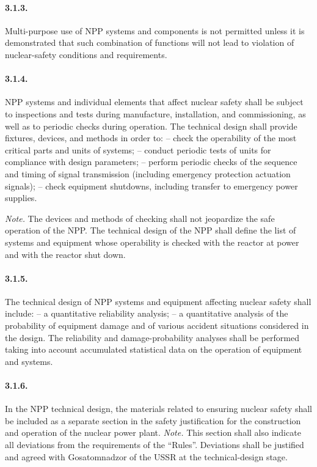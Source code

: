 \documentclass[openright]{bookest}
\begin{document}
\paragraph{3.1.3.} Multi-purpose use of NPP systems and components is not permitted unless it is demonstrated that such combination of functions will not lead to violation of nuclear-safety conditions and requirements.

\paragraph{3.1.4.} NPP systems and individual elements that affect nuclear safety shall be subject to inspections and tests during manufacture, installation, and commissioning, as well as to periodic checks during operation. The technical design shall provide fixtures, devices, and methods in order to:
-- check the operability of the most critical parts and units of systems;
-- conduct periodic tests of units for compliance with design parameters;
-- perform periodic checks of the sequence and timing of signal transmission (including emergency protection actuation signals);
-- check equipment shutdowns, including transfer to emergency power supplies.

\emph{Note.} The devices and methods of checking shall not jeopardize the safe operation of the NPP. The technical design of the NPP shall define the list of systems and equipment whose operability is checked with the reactor at power and with the reactor shut down.

\paragraph{3.1.5.} The technical design of NPP systems and equipment affecting nuclear safety shall include:
-- a quantitative reliability analysis;
-- a quantitative analysis of the probability of equipment damage and of various accident situations considered in the design.
The reliability and damage-probability analyses shall be performed taking into account accumulated statistical data on the operation of equipment and systems.

\paragraph{3.1.6.} In the NPP technical design, the materials related to ensuring nuclear safety shall be included as a separate section in the safety justification for the construction and operation of the nuclear power plant.
\emph{Note.} This section shall also indicate all deviations from the requirements of the ``Rules''. Deviations shall be justified and agreed with Gosatomnadzor of the USSR at the technical-design stage.
\end{document}
